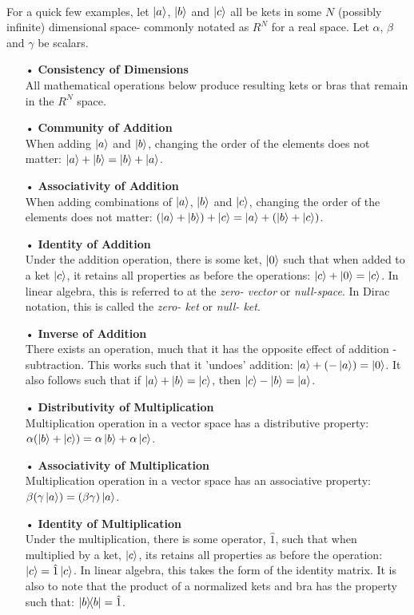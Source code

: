 \documentclass[12pt,letterpaper]{book}
\begin{document}
\paragraph*{}For a quick few examples, let $\ket{a}$, $\ket{b}$ and $\ket{c}$ all be kets in some $N$ (possibly infinite) dimensional space- commonly notated as $R^N$ for a real space. Let $\alpha$, $\beta$ and $\gamma$ be scalars. 

\begin{enumerate}
\item[•]\textbf{Consistency of Dimensions}\\
All mathematical operations below produce resulting kets or bras that remain in the $R^N$ space.
\item[•]\textbf{Community of Addition}\\
When adding $\ket{a}$ and $\ket{b}$, changing the order of the elements does not matter: 
$\ket{a} + \ket{b} = \ket{b} + \ket{a}$. 
\item[•]\textbf{Associativity of Addition}\\
When adding combinations of $\ket{a}$, $\ket{b}$ and $\ket{c}$, changing the order of the elements does not matter:
$(\ket{a} + \ket{b}) + \ket{c} = \ket{a} + (\ket{b} + \ket{c})$.
\item[•]\textbf{Identity of Addition}\\
Under the addition operation, there is some ket, $\ket{0}$ such that when added to a ket $\ket{c}$, it retains all properties as before the operations: $\ket{c} + \ket{0} = \ket{c}$. In linear algebra, this is referred to at the \textit{zero- vector} or \textit{null-space}. In Dirac notation, this is called the \textit{zero- ket} or \textit{null- ket}.
\item[•]\textbf{Inverse of Addition}\\
There exists an operation, much that it has the opposite effect of addition - subtraction. This works such that it 'undoes' addition: $\ket{a}+ (-\ket{a}) = \ket{0}$. It also follows such that if $\ket{a} + \ket{b} = \ket{c}$, then $\ket{c} - \ket{b} = \ket{a}$.
\item[•]\textbf{Distributivity of Multiplication }\\
Multiplication operation in a vector space has a distributive property: $\alpha(\ket{b} + \ket{c}) = \alpha\ket{b} + \alpha\ket{c}$.
\item[•]\textbf{Associativity of Multiplication}\\
Multiplication operation in a vector space has an associative property: $\beta(\gamma\ket{a}) = (\beta\gamma)\ket{a}$.
\item[•]\textbf{Identity of Multiplication}\\
Under the multiplication, there is some operator, $\hat{1}$, such that when multiplied by a ket, $\ket{c}$, its retains all properties as before the operation: $\ket{c} = \hat{1}\ket{c}$. In linear algebra, this takes the form of the identity matrix. It is also to note that the  product of a normalized kets and bra has the property such that: $\ketbra{b}{b} = \hat{1}$.


\end{enumerate}
\end{document}
